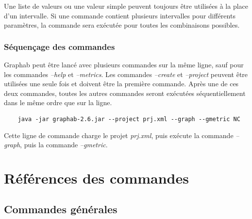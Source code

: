 \documentclass[a4paper,10pt]{report}
\begin{document}
Une liste de valeurs ou une valeur simple peuvent toujours être utilisées à la place d'un intervalle.
Si une commande contient plusieurs intervalles pour différents paramètres, la commande sera exécutée pour toutes les combinaisons possibles.

\subsection{Séquençage des commandes}
Graphab peut être lancé avec plusieurs commandes sur la même ligne, sauf pour les commandes \textit{--help} et \textit{--metrics}.
Les commandes \textit{--create} et \textit{--project} peuvent être utilisées une seule fois et doivent être la première commande.
Après une de ces deux commandes, toutes les autres commandes seront exécutées séquentiellement dans le même ordre que sur la ligne.

\begin{Verbatim}
	java -jar graphab-2.6.jar --project prj.xml --graph --gmetric NC  
\end{Verbatim}
Cette ligne de commande charge le projet \textit{prj.xml}, puis exécute la commande \textit{--graph}, puis la commande \textit{--gmetric}.


\chapter{Références des commandes}
\section{Commandes générales}
\end{document}
